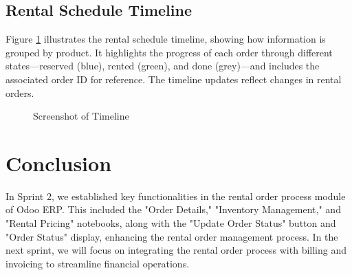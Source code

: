 \subsection{Rental Schedule Timeline}
Figure \ref{fig:rental_schedule_timeline} illustrates the rental schedule timeline, showing how information is grouped by product. It highlights the progress of each order through different states—reserved (blue), rented (green), and done (grey)—and includes the associated order ID for reference. The timeline updates reflect changes in rental orders.

\begin{figure}[h]
    \centering
    \caption{Screenshot of Timeline}
    \label{fig:rental_schedule_timeline}
\end{figure}
\newpage
\section*{Conclusion}

In Sprint 2, we established key functionalities in the rental order process module of Odoo ERP. This included the "Order Details," "Inventory Management," and "Rental Pricing" notebooks, along with the "Update Order Status" button and "Order Status" display, enhancing the rental order management process. In the next sprint, we will focus on integrating the rental order process with billing and invoicing to streamline financial operations.
